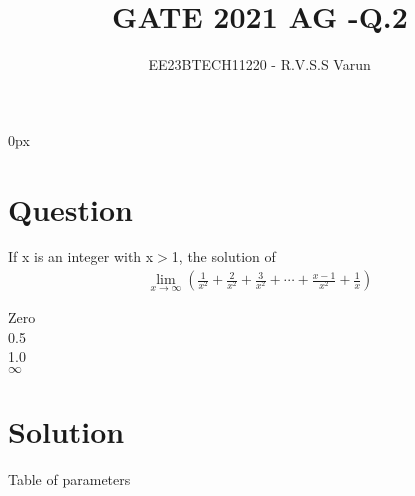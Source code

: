 \documentclass[beamer]{IEEEtran}
\theoremstyle{remark}
\begin{document}
\parindent 0px


\title{GATE 2021 AG -Q.2}
\author{EE23BTECH11220 - R.V.S.S Varun$^{}$%
}
\maketitle
\newpage
\bigskip

\renewcommand{\thefigure}{\theenumi}
\renewcommand{\thetable}{\theenumi}
\section*{Question}
If x is an integer with  x$>$1, the solution of 
\begin{align*}
\lim_{x\to\infty}\left(\frac{1}{x^2}+\frac{2}{x^2}+\frac{3}{x^2}+\cdots+\frac{x-1}{x^2}+\frac{1}{x}\right)
\end{align*}

 Zero \\
 0.5  \\
 1.0 \\
 $\infty$  \hfill{}

\section*{Solution}

\begin{table}[h]
    \centering

 \caption{Table of parameters}
    \label{tab:AG.2.1}
\end{table}
\end{document}
